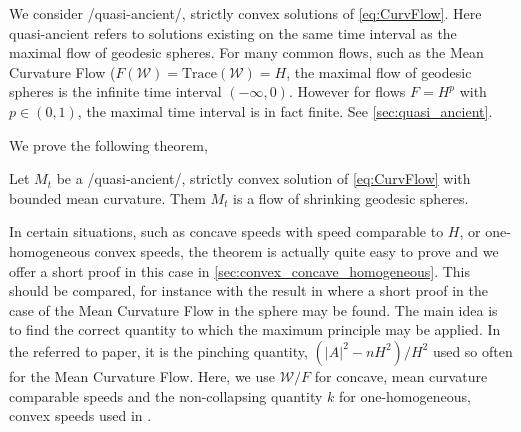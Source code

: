 \documentclass{amsart}
\begin{document}
We consider /quasi-ancient/, strictly convex solutions of \eqref{eq:CurvFlow}. Here quasi-ancient refers to solutions existing on the same time interval as the maximal flow of geodesic spheres. For many common flows, such as the Mean Curvature Flow (\(F(\mathcal{W}) = \text{Trace}(\mathcal{W}) = H\), the maximal flow of geodesic spheres is the infinite time interval \((-\infty, 0)\). However for flows \(F = H^p\) with \(p \in (0,1)\), the maximal time interval is in fact finite. See \cref{sec:quasi_ancient}.

We prove the following theorem,
\begin{theorem}
Let \(M_t\) be a /quasi-ancient/, strictly convex solution of \eqref{eq:CurvFlow} with bounded mean curvature. Them \(M_t\) is a flow of shrinking geodesic spheres.
\end{theorem}

In certain situations, such as concave speeds with speed comparable to \(H\), or one-homogeneous convex speeds, the theorem is actually quite easy to prove and we offer a short proof in this case in \cref{sec:convex_concave_homogeneous}. This should be compared, for instance with the result in \cite[Theorem]{huiskensinestrari} where a short proof in the case of the Mean Curvature Flow in the sphere may be found. The main idea is to find the correct quantity to which the maximum principle may be applied. In the referred to paper, it is the pinching quantity, \((|A|^2 - n H^2)/H^2\) used so often for the Mean Curvature Flow. Here, we use \(\mathcal{W}/F\) for concave, mean curvature comparable speeds and the non-collapsing quantity \(k\) for one-homogeneous, convex speeds used in \cite{andrewsetal}.
\end{document}
